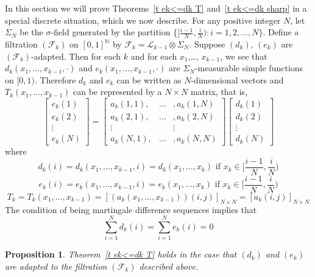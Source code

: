 \documentclass[12pt]{amsart}
\newtheorem{pro}[thm]{Proposition}
\begin{document}
In this section we will prove Theorems~\ref{t ek<=dk T} and~\ref{t
ek<=dk sharp} in a special discrete situation, which we now
describe. For any positive integer $N$, let $\Sigma_N $ be the
$\sigma $-field generated by the partition
$\{[\frac{i-1}{N},\frac{i}{N}): i=1,2,\dots,N\}$. Define a
filtration $(\mathcal{F}_k)$ on $[0,1]^{\mathbb{N}}$ by
$\mathcal{F}_k=\mathcal{L}_{k-1}\otimes \Sigma_N $. Suppose
$(d_k)$, $(e_k)$ are $(\mathcal{F}_k)$-adapted.  Then for each $k$
and for each $x_1$,\dots, $x_{k-1}$, we see that
$d_k(x_1,\dots,x_{k-1},\cdot)$ and $e_k(x_1,\dots,x_{k-1},\cdot)$
are $\Sigma_N$-measurable simple functions on $[0,1)$. Therefore
$d_k$ and $e_k$ can be written as $N$-dimensional vectors and
$T_k(x_1,\dots,x_{k-1})$ can be represented by a $N\times N$
matrix, that is,
\[
\left[ \begin{array}{c} e_k(1) \\ e_k(2) \\ \vdots \\ e_k(N)
\end{array} \right ]
= \left[\begin{array}{ccc} a_k(1,1), &\dots& ,a_k(1,N) \\
a_k(2,1), &\dots& ,a_k(2,N) \\ \vdots & & \vdots \\ a_k(N,1),
&\dots& ,a_k(N,N)\end{array}\right] \left[ \begin{array}{c} d_k(1)
\\ d_k(2) \\ \vdots \\ d_k(N) \end{array} \right]
\]
where
\[d_k(i)=d_k(x_1,\dots,x_{k-1},i)=d_k(x_1,\dots,x_{k})
\mbox{ if $x_k \in [\frac{i-1}{N},\frac{i}{N})$}\]
\[e_k(i)=e_k(x_1,\dots,x_{k-1},i)=e_k(x_1,\dots,x_{k})
\mbox{ if $x_k \in [\frac{i-1}{N},\frac{i}{N})$}\]
\[T_k=T_k(x_1,\dots,x_{k-1})=\left[(a_k(x_1,\dots,x_{k-1}))(i,j)\right]_{N\times N}=\left[a_k(i,j)\right]_{N\times N}\]
The condition of being martingale difference sequences implies that
\[ \sum_{i=1}^N d_k(i)= \sum_{i=1}^N e_k(i)=0\]

\begin{pro}
\label{t ek<=dk T disc}
Theorem~\ref{t ek<=dk T} holds in the case that
$(d_k)$ and $(e_k)$ are
adapted to the filtration $(\mathcal F_k)$ described above.
\end{pro}
\end{document}
